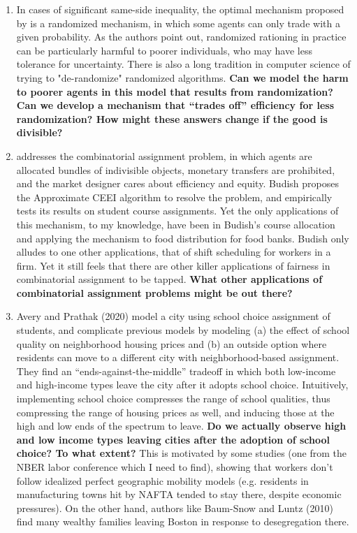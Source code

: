 \documentclass[JEL]{AEA}
\begin{document}
\begin{enumerate}
    \item In cases of significant same-side inequality, the optimal mechanism proposed by \cite{dworczak-2020} is a randomized mechanism, in which some agents can only trade with a given probability. As the authors point out, randomized rationing in practice can be particularly harmful to poorer individuals, who may have less tolerance for uncertainty. There is also a long tradition in computer science of trying to "de-randomize" randomized algorithms. \textbf{Can we model the harm to poorer agents in this model that results from randomization? Can we develop a mechanism that ``trades off'' efficiency for less randomization? How might these answers change if the good is divisible?}
    
    \item \cite{budish-2011} addresses the combinatorial assignment problem, in which agents are allocated bundles of indivisible objects, monetary transfers are prohibited, and the market designer cares about efficiency and equity. Budish proposes the Approximate CEEI algorithm to resolve the problem, and empirically tests its results on student course assignments. Yet the only applications of this mechanism, to my knowledge, have been in Budish's course allocation and \cite{prendergast-2017} applying the mechanism to food distribution for food banks. Budish only alludes to one other applications, that of shift scheduling for workers in a firm. Yet it still feels that there are other killer applications of fairness in combinatorial assignment to be tapped. \textbf{What other applications of combinatorial assignment problems might be out there?}
    
    \item Avery and Prathak (2020) model a city using school choice assignment of students, and complicate previous models by modeling (a) the effect of school quality on neighborhood housing prices and (b) an outside option where residents can move to a different city with neighborhood-based assignment. They find an “ends-against-the-middle” tradeoff in which both low-income and high-income types leave the city after it adopts school choice. Intuitively, implementing school choice compresses the range of school qualities, thus compressing the range of housing prices as well, and inducing those at the high and low ends of the spectrum to leave. \textbf{Do we actually observe high and low income types leaving cities after the adoption of school choice? To what extent?} This is motivated by some studies (one from the NBER labor conference which I need to find), showing that workers don’t follow idealized perfect geographic mobility models (e.g. residents in manufacturing towns hit by NAFTA tended to stay there, despite economic pressures). On the other hand, authors like Baum-Snow and Luntz (2010) find many wealthy families leaving Boston in response to desegregation there.


\end{enumerate}
\end{document}
